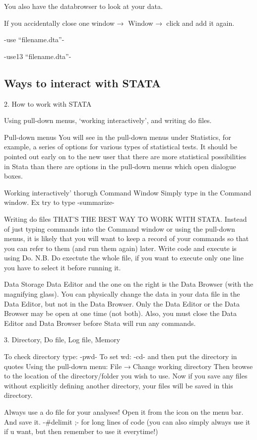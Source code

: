 \documentclass[11pt]{article}
\theoremstyle{definition}
\begin{document}
You also have the databrowser to look at your data.

If you accidentally close one window → Window →click and add it again.

-use “filename.dta”-

-use13 “filename.dta”-

\subsection{Ways to interact with STATA}
2. How to work with STATA

Using pull-down menus, ‘working interactively’, and writing do files.

Pull-down menus
You will see in the pull-down menus under Statistics, for example, a series of options for various types
of statistical tests. It should be pointed out early on to the new user that there are more statistical possibilities in Stata than there are options in the pull-down menus which open dialogue boxes.

Working interactively’ thorugh Command Window
Simply type in the Command window. Ex try to type -summarize-

Writing do files
THAT'S THE BEST WAY TO WORK WITH STATA.
Instead of just typing commands into the Command window or using the pull-down menus, it is likely that you will want to keep a record of your commands so that you can refer to them (and run them again) later.
Write code and execute is using Do. N.B. Do exectute the whole file, if you want to execute only one line you have to select it before running it.

Data Storage
Data Editor and the one on the right is the Data Browser (with the magnifying glass). You can physically change the data in your data file in the Data Editor, but not in the Data Browser. Only the Data Editor or the Data Browser may be open at one time (not both). Also, you must close the Data Editor and Data Browser before Stata will run any commands.


	3. Directory, Do file, Log file, Memory

To check directory type: -pwd-
To set wd:  -cd-  and then put the directory in quotes
Using the pull-down menu: File →Change working directory
Then browse to the location of the directory/folder you wish to use. Now if you save any files without explicitly defining another directory, your files will be saved in this directory.

Always use a do file for your analyses!
Open it from the icon on the menu bar. And save it.
-#delimit ;-
for long lines of code (you can also simply always use it if u want, but then remember to use it everytime!)
\end{document}
